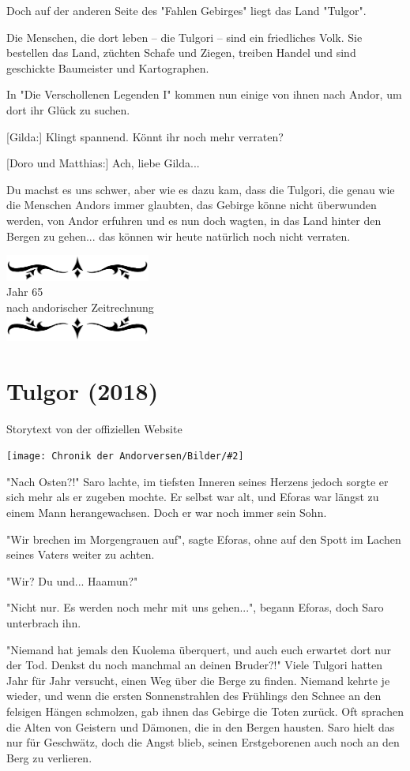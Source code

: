 \documentclass[10pt, a4paper, oneside]{book}
\newcommand{\fillbreak}{\vspace*{\fill}\columnbreak}
\newcommand{\storytext}[1]{%
    \section{#1}%
    \label{Storytext: #1}%
}
\newcommand{\bildmitts}[2][height=0.32\textwidth,width=0.48\textwidth,keepaspectratio]{%
    \begin{center}
        \texttt{[image: Chronik der Andorversen/Bilder/\#2]}
    \end{center}
}
\newcommand{\az}[1]{%
    \begin{center}
        \includegraphics[width=180px]{Chronik der Andorversen/verzierung1.png}\\
        {\Huge #1} \\
        {nach andorischer Zeitrechnung}\\
        \includegraphics[width=180px]{Chronik der Andorversen/verzierung2.png}
    \end{center}
    \extramarks{}{#1 a.Z.}
}
\begin{document}
\begin{multicols}{2}
Doch auf der anderen Seite des "Fahlen Gebirges" liegt das Land "Tulgor".

Die Menschen, die dort leben – die Tulgori – sind ein friedliches Volk. Sie bestellen das Land, züchten Schafe und Ziegen, treiben Handel und sind geschickte Baumeister und Kartographen.

In "Die Verschollenen Legenden I" kommen nun einige von ihnen nach Andor, um dort ihr Glück zu suchen.

[Gilda:] Klingt spannend. Könnt ihr noch mehr verraten?

[Doro und Matthias:] Ach, liebe Gilda...

Du machst es uns schwer, aber wie es dazu kam, dass die Tulgori, die genau wie die Menschen Andors immer glaubten, das Gebirge könne nicht überwunden werden, von Andor erfuhren und es nun doch wagten, in das Land hinter den Bergen zu gehen... das können wir heute natürlich noch nicht verraten.



\fillbreak
\az{Jahr 65}
\storytext{Tulgor (2018)}

\begin{center}
    Storytext von der offiziellen Website
\end{center}

\bildmitts{Tulgor (2018).jpg}

"Nach Osten?!" Saro lachte, im tiefsten Inneren seines Herzens jedoch sorgte er sich mehr als er zugeben mochte. Er selbst war alt, und Eforas war längst zu einem Mann herangewachsen. Doch er war noch immer sein Sohn.

"Wir brechen im Morgengrauen auf", sagte Eforas, ohne auf den Spott im Lachen seines Vaters weiter zu achten.

"Wir? Du und... Haamun?"

"Nicht nur. Es werden noch mehr mit uns gehen...", begann Eforas, doch Saro unterbrach ihn.

"Niemand hat jemals den Kuolema überquert, und auch euch erwartet dort nur der Tod. Denkst du noch manchmal an deinen Bruder?!" Viele Tulgori hatten Jahr für Jahr versucht, einen Weg über die Berge zu finden. Niemand kehrte je wieder, und wenn die ersten Sonnenstrahlen des Frühlings den Schnee an den felsigen Hängen schmolzen, gab ihnen das Gebirge die Toten zurück. Oft sprachen die Alten von Geistern und Dämonen, die in den Bergen hausten. Saro hielt das nur für Geschwätz, doch die Angst blieb, seinen Erstgeborenen auch noch an den Berg zu verlieren.


\end{multicols}
\end{document}
